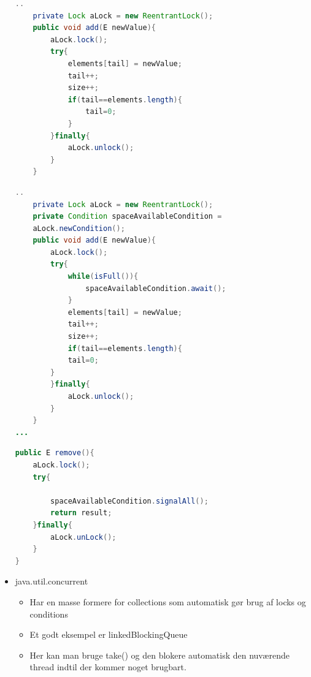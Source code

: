 \documentclass{article}
\begin{document}
\begin{itemize}
\begin{lstlisting}[language=java]
..
	private Lock aLock = new ReentrantLock();
	public void add(E newValue){
		aLock.lock();
		try{
			elements[tail] = newValue;
			tail++;
			size++;
			if(tail==elements.length){
				tail=0;
			}
		}finally{
			aLock.unlock();
		}
	}
\end{lstlisting}

\begin{lstlisting}[language=java]
..
	private Lock aLock = new ReentrantLock();
	private Condition spaceAvailableCondition =
	aLock.newCondition();
	public void add(E newValue){
		aLock.lock();
		try{
			while(isFull()){
				spaceAvailableCondition.await();
			}
			elements[tail] = newValue;
			tail++;
			size++;
			if(tail==elements.length){
			tail=0;
		}
		}finally{
			aLock.unlock();
		}
	}
...
\end{lstlisting}

\begin{lstlisting}[language=java]
public E remove(){
	aLock.lock();
	try{
		
		spaceAvailableCondition.signalAll();
		return result;
	}finally{
		aLock.unLock();
	}
}
\end{lstlisting}

	\item java.util.concurrent
	\begin{itemize}
		\item Har en masse formere for collections som automatisk gør brug af locks og conditions
		\item Et godt eksempel er linkedBlockingQueue
		\item Her kan man bruge take() og den blokere automatisk den nuværende thread indtil der kommer noget brugbart. 
	\end{itemize}
\end{itemize}


\newpage
\end{document}
